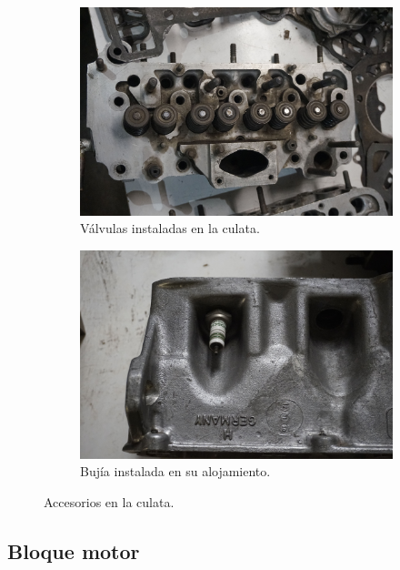 \begin{figure}[H]
	\centering
	\begin{subfigure}[b]{0.45\textwidth}
		\centering
		\includegraphics[width=\linewidth]{Figures/02/m3/head_top_val.jpg}
		\caption{Válvulas instaladas en la culata.}
		\label{fig:head_val}
	\end{subfigure}
	\hfill
	\begin{subfigure}[b]{0.45\textwidth}
 		\centering
 		\includegraphics[width=\linewidth]{Figures/02/m3/head_sparkplug.jpg}
 		\caption{Bujía instalada en su alojamiento.}
		\label{fig:head_spark}
	\end{subfigure}    
	\caption{Accesorios en la culata.}
	\label{fig:C_accesory}
\end{figure}

\subsection{Bloque motor} \label{ss:bloque}

